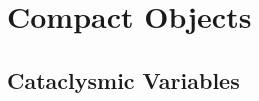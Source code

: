 

\chapter{Compact Objects}
\thispagestyle{empty}




	\section{Cataclysmic Variables}



\cite{harris_catalog_1996}


\clearpage

\thispagestyle{empty}

